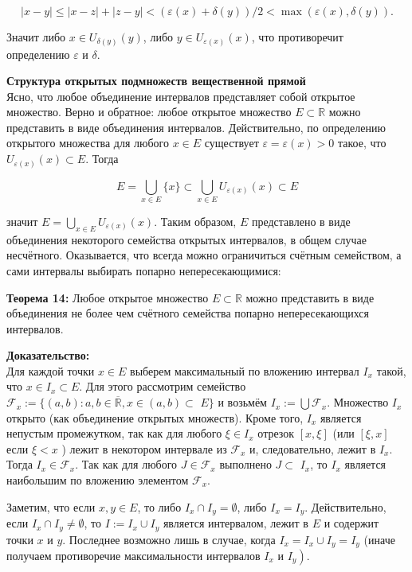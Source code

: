 \documentclass[a4paper,12pt]{article} %
\begin{document}
$$
|x-y| \leq|x-z|+|z-y|<(\varepsilon(x)+\delta(y)) / 2<\max (\varepsilon(x), \delta(y)) .
$$

Значит либо $x \in U_{\delta(y)}(y)$, либо $y \in U_{\varepsilon(x)}(x)$, что противоречит определению $\varepsilon$ и $\delta$.

\textbf{Структура открытых подмножеств вещественной прямой}\\
Ясно, что любое объединение интервалов представляет собой открытое множество. Верно и обратное: любое открытое множество $E \subset \mathbb{R}$ можно представить в виде объединения интервалов. Действительно, по определению открытого множества для любого $x \in E$ существует $\varepsilon=\varepsilon(x)>0$ такое, что $U_{\varepsilon(x)}(x) \subset E$. Тогда

$$
E=\bigcup_{x \in E}\{x\} \subset \bigcup_{x \in E} U_{\varepsilon(x)}(x) \subset E
$$

значит $E=\bigcup_{x \in E} U_{\varepsilon(x)}(x)$. Таким образом, $E$ представлено в виде объединения некоторого семейства открытых интервалов, в общем случае несчётного. Оказывается, что всегда можно ограничиться счётным семейством, а сами интервалы выбирать попарно непересекающимися:

\textbf{Теорема 14:} Любое открытое множество $E \subset \mathbb{R}$ можно представить в виде объединения не более чем счётного семейства попарно непересекающихся интервалов.

\textbf{Доказательство:}\\
Для каждой точки $x \in E$ выберем максимальный по вложению интервал $I_{x}$ такой, что $x \in I_{x} \subset E$. Для этого рассмотрим семейство $\mathcal{F}_{x}:=\{(a, b): a, b \in \overline{\mathbb{R}}, x \in(a, b) \subset$ $E\}$ и возьмём $I_{x}:=\bigcup \mathcal{F}_{x}$. Множество $I_{x}$ открыто (как объединение открытых множеств). Кроме того, $I_{x}$ является непустым промежутком, так как для любого $\xi \in I_{x}$ отрезок $[x, \xi]$ (или $[\xi, x]$ если $\xi<x$ ) лежит в некотором интервале из $\mathcal{F}_{x}$ и, следовательно, лежит в $I_{x}$. Тогда $I_{x} \in \mathcal{F}_{x}$. Так как для любого $J \in \mathcal{F}_{x}$ выполнено $J \subset$ $I_{x}$, то $I_{x}$ является наибольшим по вложению элементом $\mathcal{F}_{x}$.

Заметим, что если $x, y \in E$, то либо $I_{x} \cap I_{y}=\emptyset$, либо $I_{x}=I_{y}$. Действительно, если $I_{x} \cap I_{y} \neq \emptyset$, то $I:=I_{x} \cup I_{y}$ является интервалом, лежит в $E$ и содержит точки $x$ и $y$. Последнее возможно лишь в случае, когда $I_{x}=I_{x} \cup I_{y}=I_{y}$ (иначе получаем противоречие максимальности интервалов $I_{x}$ и $\left.I_{y}\right)$.
\end{document}
